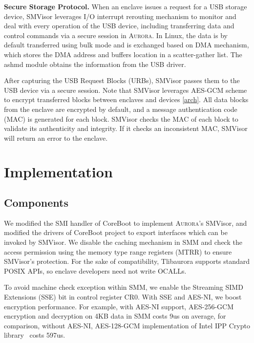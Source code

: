\documentclass[journal,twocolumn,letterpaper,10pt]{IEEEtran}
\begin{document}
\textbf{Secure Storage Protocol.}
When an enclave issues a request for a USB storage device, SMVisor leverages I/O interrupt rerouting mechanism to monitor and deal with every operation of the USB device, including transferring data and control commands via a secure session in \textsc{Aurora}. In Linux, the data is by default transferred using bulk mode and is exchanged based on DMA mechanism, which stores the DMA address and buffers location in a {scatter-gather} list. The ashmd module obtains the information from the USB driver.

After capturing the USB Request Blocks (URBs), SMVisor passes them to the USB device via a secure session.  Note that SMVisor leverages AES-GCM scheme to encrypt transferred blocks between enclaves and devices \ref{arch}. All data blocks from the enclave are encrypted by default, and a message authentication code (MAC) is generated for each block. SMVisor checks the MAC of each block to validate its authenticity and integrity. If it checks an inconsistent MAC, SMVisor will return an error to the enclave.

\section{Implementation}

\subsection{Components}

We modified the SMI handler of CoreBoot to implement \textsc{Aurora}'s SMVisor, and modified the drivers of CoreBoot project to export interfaces which can be invoked by SMVisor. We disable the caching mechanism in SMM and check the access permission using the memory type range registers (MTRR) to ensure SMVisor's protection. For the sake of compatibility, Tlibaurora supports standard
POSIX APIs, so enclave developers need not write OCALLs.

To avoid machine check exception within SMM, we enable the Streaming SIMD Extensions (SSE) bit in control register CR0. With SSE and AES-NI, we boost encryption performance. For example, with AES-NI support, AES-256-GCM encryption and decryption on 4KB data in SMM costs 9us on average, for comparison,  without AES-NI, AES-128-GCM implementation of Intel IPP Crypto library~\cite{Intel_IPP_2017_Update_2} costs 597us.
\end{document}
